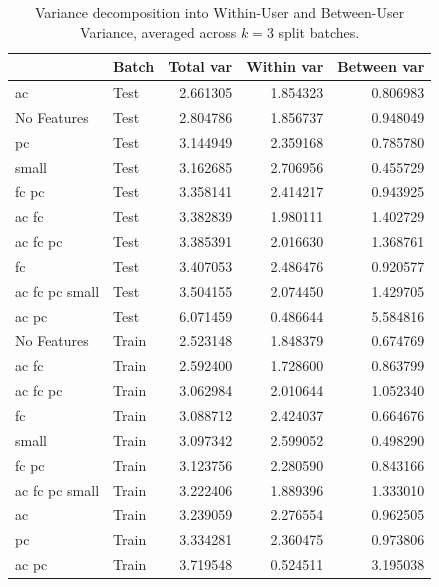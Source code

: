   \begin{table}[H]
\centering
\begin{tabular}{llrrr}
\toprule
{} &  Batch &  Total var &  Within var &  Between var \\
\midrule
ac             &   Test &   2.661305 &    1.854323 &     0.806983 \\
No Features    &   Test &   2.804786 &    1.856737 &     0.948049 \\
pc             &   Test &   3.144949 &    2.359168 &     0.785780 \\
small          &   Test &   3.162685 &    2.706956 &     0.455729 \\
fc pc          &   Test &   3.358141 &    2.414217 &     0.943925 \\
ac fc          &   Test &   3.382839 &    1.980111 &     1.402729 \\
ac fc pc       &   Test &   3.385391 &    2.016630 &     1.368761 \\
fc             &   Test &   3.407053 &    2.486476 &     0.920577 \\
ac fc pc small &   Test &   3.504155 &    2.074450 &     1.429705 \\
ac pc          &   Test &   6.071459 &    0.486644 &     5.584816 \\
No Features    &  Train &   2.523148 &    1.848379 &     0.674769 \\
ac fc          &  Train &   2.592400 &    1.728600 &     0.863799 \\
ac fc pc       &  Train &   3.062984 &    2.010644 &     1.052340 \\
fc             &  Train &   3.088712 &    2.424037 &     0.664676 \\
small          &  Train &   3.097342 &    2.599052 &     0.498290 \\
fc pc          &  Train &   3.123756 &    2.280590 &     0.843166 \\
ac fc pc small &  Train &   3.222406 &    1.889396 &     1.333010 \\
ac             &  Train &   3.239059 &    2.276554 &     0.962505 \\
pc             &  Train &   3.334281 &    2.360475 &     0.973806 \\
ac pc          &  Train &   3.719548 &    0.524511 &     3.195038 \\
\bottomrule
\end{tabular}
\caption{Variance decomposition into Within-User and Between-User Variance, averaged across $k = 3$ split batches.}
\label{Variance Decomposition Table}
\end{table}

